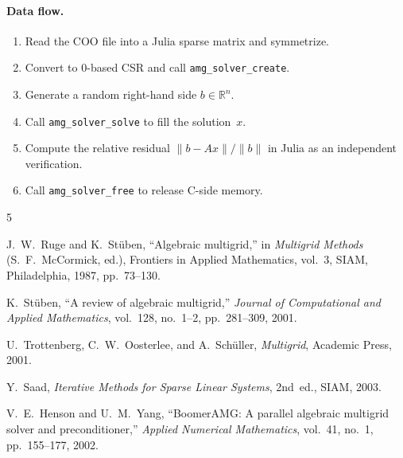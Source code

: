 \documentclass[11pt]{article}
\newcommand{\R}{\mathbb{R}}
\begin{document}
\paragraph{Data flow.}
\begin{enumerate}
  \item Read the COO file into a Julia sparse matrix and symmetrize.
  \item Convert to 0-based CSR and call \texttt{amg\_solver\_create}.
  \item Generate a random right-hand side $b \in \R^n$.
  \item Call \texttt{amg\_solver\_solve} to fill the solution~$x$.
  \item Compute the relative residual $\|b - Ax\| / \|b\|$ in Julia
    as an independent verification.
  \item Call \texttt{amg\_solver\_free} to release C-side memory.
\end{enumerate}


\begin{thebibliography}{5}

  J.~W.~Ruge and K.~St\"uben,
  ``Algebraic multigrid,''
  in \emph{Multigrid Methods} (S.~F.~McCormick, ed.),
  Frontiers in Applied Mathematics, vol.~3,
  SIAM, Philadelphia, 1987, pp.~73--130.

  K.~St\"uben,
  ``A review of algebraic multigrid,''
  \emph{Journal of Computational and Applied Mathematics},
  vol.~128, no.~1--2, pp.~281--309, 2001.

  U.~Trottenberg, C.~W.~Oosterlee, and A.~Sch\"uller,
  \emph{Multigrid},
  Academic Press, 2001.

  Y.~Saad,
  \emph{Iterative Methods for Sparse Linear Systems},
  2nd~ed., SIAM, 2003.

  V.~E.~Henson and U.~M.~Yang,
  ``{BoomerAMG}: A parallel algebraic multigrid solver and
  preconditioner,''
  \emph{Applied Numerical Mathematics},
  vol.~41, no.~1, pp.~155--177, 2002.

\end{thebibliography}
\end{document}
